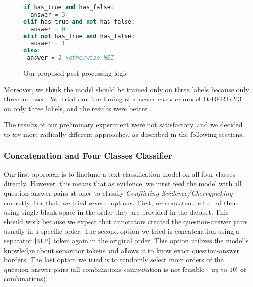 \begin{figure}
    \begin{lstlisting}[language=Python, frame=single]
if has_true and has_false:
  answer = 3
elif has_true and not has_false:
  answer = 0
elif not has_true and has_false:
  answer = 1
else:
 answer = 2 #otherwise NEI
        \end{lstlisting}
    \caption{Our proposed post-processing logic} 
    \label{lst:post-processing}       
\end{figure}

Moreover, we think the model should be trained only on three labels because only three are used. We tried our fine-tuning of a newer encoder model DeBERTaV3~\cite{he2023debertav3improvingdebertausing} on only three labels, and the results were better .

The results of our preliminary experiment were not satisfactory, and we decided to try more radically different approaches, as described in the following sections.

\subsubsection*{Concatenation and Four Classes Classifier}
\label{subsubsec:concatenation}
Our first approach is to finetune a text classification model on all four classes directly. However, this means that as evidence, we must feed the model with all question-answer pairs at once to classify \textit{Conflicting Evidence/Cherrypicking} correctly. For that, we tried several options. First, we concatenated all of them using single blank space in the order they are provided in the dataset. This should work because we expect that annotators created the question-answer pairs usually in a specific order. The second option we tried is concatenation using a separator \texttt{[SEP]} token again in the original order. This option utilizes the model's knowledge about separator tokens and allows it to know exact question-answer borders. The last option we tried is to randomly select more orders of the question-answer pairs (all combinations computation is not feasible - up to $10!$ of combinations).

